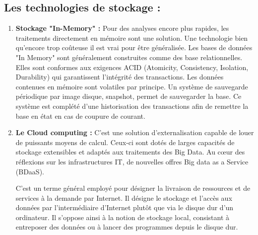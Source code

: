 \subsection{Les technologies de stockage :}
\begin{enumerate}
\item  \textbf{Stockage "In-Memory" :}
Pour des analyses encore plus rapides, les traitements directement en mémoire sont une solution. Une technologie bien qu'encore trop coûteuse il est vrai pour être généralisée. Les bases de données "In Memory" sont généralement construites comme des base relationnelles. Elles sont conformes aux exigences ACID (Atomicity, Consistency, Isolation, Durability) qui garantissent l'intégrité des transactions. Les données contenues en mémoire sont volatiles par principe. Un système de sauvegarde périodique par image disque, snapshot, permet de sauvegarder la base. Ce système est complété d'une historisation des transactions afin de remettre la base en état en cas de coupure de courant.

\item \textbf{Le Cloud computing :}
C’est une solution d'externalisation capable de louer de puissants moyens de calcul. Ceux-ci sont dotés de larges capacités de stockage extensibles et adaptés aux traitements des Big Data. Au cœur des réflexions sur les infrastructures IT, de nouvelles offres Big data as a Service (BDaaS).

C'est un terme général employé pour désigner la livraison de ressources et de services à la demande par Internet. Il désigne le stockage et l'accès aux données par l'intermédiaire d'Internet plutôt que via le disque dur d'un ordinateur. Il s'oppose ainsi à la notion de stockage local, consistant à entreposer des données ou à lancer des programmes depuis le disque dur.

\end{enumerate}



